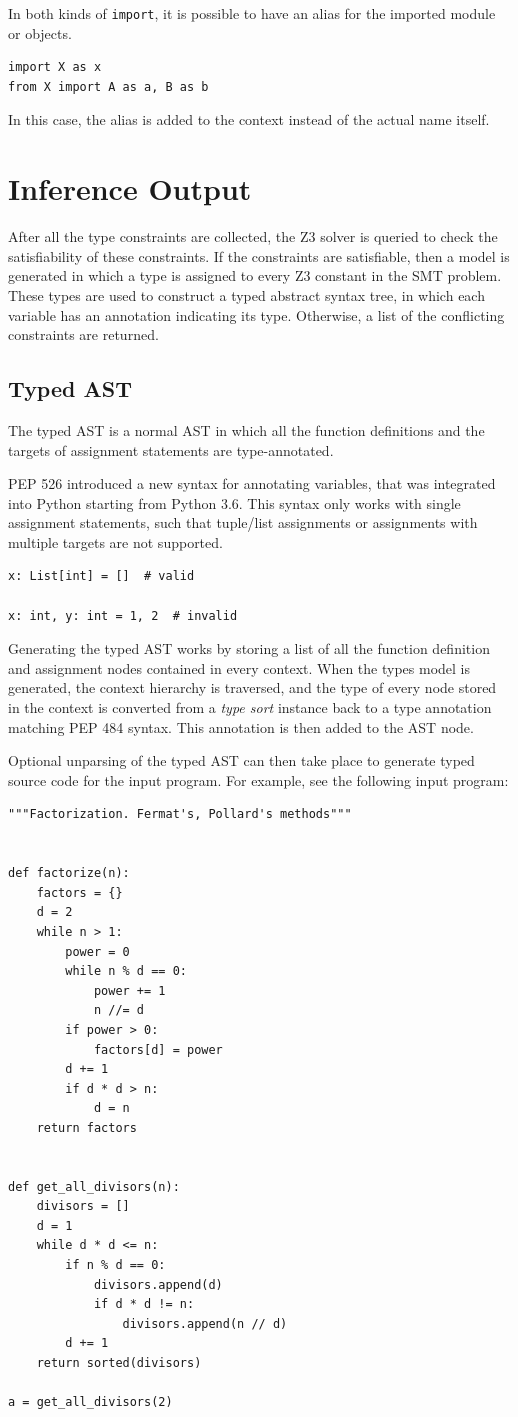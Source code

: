 In both kinds of \lstinline|import|, it is possible to have an alias for the imported module or objects.
\begin{lstlisting}
import X as x
from X import A as a, B as b
\end{lstlisting}
In this case, the alias is added to the context instead of the actual name itself.
\section{Inference Output}
After all the type constraints are collected, the Z3 solver is queried to check the satisfiability of these constraints. If the constraints are satisfiable, then a model is generated in which a type is assigned to every Z3 constant in the SMT problem. These types are used to construct a typed abstract syntax tree, in which each variable has an annotation indicating its type. Otherwise, a list of the conflicting constraints are returned.
\subsection{Typed AST}
The typed AST is a normal AST in which all the function definitions and the targets of assignment statements are type-annotated.

PEP 526 \cite{526} introduced a new syntax for annotating variables, that was integrated into Python starting from Python 3.6. This syntax only works with single assignment statements, such that tuple/list assignments or assignments with multiple targets are not supported.

\begin{lstlisting}
x: List[int] = []  # valid

x: int, y: int = 1, 2  # invalid
\end{lstlisting}

Generating the typed AST works by storing a list of all the function definition and assignment nodes contained in every context. When the types model is generated, the context hierarchy is traversed, and the type of every node stored in the context is converted from a \textit{type sort} instance back to a type annotation matching PEP 484 syntax. This annotation is then added to the AST node.

Optional unparsing of the typed AST can then take place to generate typed source code for the input program. For example, see the following input program:
\begin{lstlisting}
"""Factorization. Fermat's, Pollard's methods"""


def factorize(n):
	factors = {}
	d = 2
	while n > 1:
		power = 0
		while n % d == 0:
			power += 1
			n //= d
		if power > 0:
			factors[d] = power
		d += 1
		if d * d > n:
			d = n
	return factors


def get_all_divisors(n):
	divisors = []
	d = 1
	while d * d <= n:
		if n % d == 0:
			divisors.append(d)
			if d * d != n:
				divisors.append(n // d)
		d += 1
	return sorted(divisors)

a = get_all_divisors(2)
\end{lstlisting}

